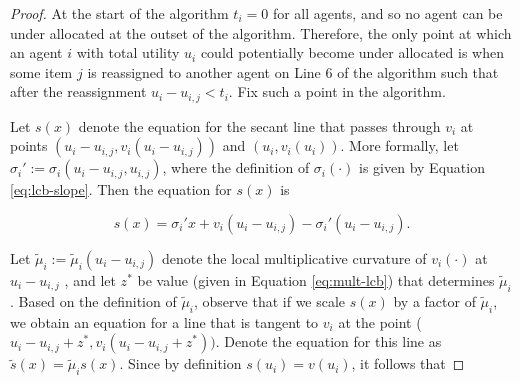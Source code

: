 \begin{proof}
At the start of the algorithm $t_i = 0$ for all agents, and so no agent can be under allocated at the outset of the algorithm.
Therefore, the only point at which 
an agent $i$ with total utility $u_i$ could potentially become under allocated is when some item $j$ is reassigned to another agent on Line 6 of the algorithm such that after the reassignment $u_i - u_{i,j} < t_i$. Fix 
such a point in the algorithm. 



Let $s(x)$ denote the equation for the secant line that passes through $v_i$ at points $(u_i- u_{i,j}, v_i(u_i- u_{i,j}))$ and $(u_i, v_i(u_i))$. 
More formally, let $\sigma_i' := \sigma_i(u_i - u_{i,j}, u_{i,j})$, 
where the definition of $\sigma_i(\cdot)$ is given by Equation \eqref{eq:lcb-slope}.
Then the equation for $s(x)$ is

\begin{equation}
s(x) = \sigma_i' x + v_i(u_i - u_{i,j}) - \sigma_i'  (u_i - u_{i,j}).
\end{equation}

Let $\tilde\mu_i := \tilde\mu_i(u_i-u_{i,j})$ denote the local multiplicative curvature of $v_i(\cdot)$ at $u_i-u_{i,j}$  , and let $z^*$ be value (given in Equation \eqref{eq:mult-lcb}) that determines $\tilde\mu_i$.
Based on the definition of $\tilde\mu_i$, observe that if we scale $s(x)$  by a factor of $\tilde\mu_i$, we obtain an equation for a line that is tangent to 
$v_i$ at the point ($u_i - u_{i,j} + z^*, v_i(u_i - u_{i,j}+ z^*))$. 
Denote the equation for this line as $\tilde{s}(x) = \tilde\mu_is(x)$. 
Since by definition $s(u_i) = v(u_i)$, it follows that


\end{proof}
